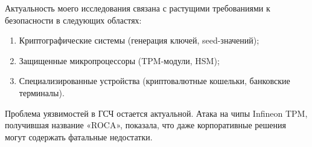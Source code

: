 Актуальность моего исследования связана с растущими требованиями к
безопасности в следующих областях:

\begin{enumerate}
\def\labelenumi{\arabic{enumi}.}
\item
  Криптографические системы (генерация ключей, seed-значений);
\item
  Защищенные микропроцессоры (TPM-модули, HSM);
\item
  Специализированные устройства (криптовалютные кошельки, банковские
  терминалы).
\end{enumerate}

Проблема уязвимостей в ГСЧ остается актуальной. Атака на чипы Infineon
TPM, получившая название «ROCA», показала, что даже корпоративные
решения могут содержать фатальные недостатки.

